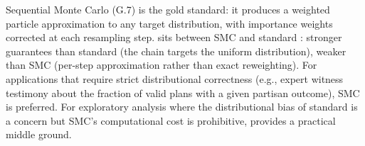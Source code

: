 Sequential Monte Carlo (G.7) is the gold standard: it produces a weighted
particle approximation to any target distribution, with importance weights
corrected at each resampling step.
\fr{} sits between SMC and standard \recom{}:
stronger guarantees than standard \recom{} (the chain targets the uniform
distribution), weaker than SMC (per-step approximation rather than exact
reweighting).
For applications that require strict distributional correctness (e.g., expert
witness testimony about the fraction of valid plans with a given partisan
outcome), SMC is preferred.
For exploratory analysis where the distributional bias of standard \recom{}
is a concern but SMC's computational cost is prohibitive, \fr{} provides a
practical middle ground.
